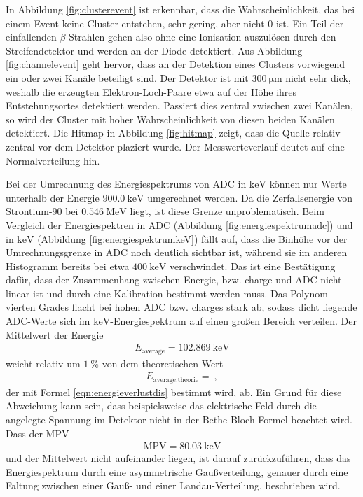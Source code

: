In Abbildung \ref{fig:clusterevent} ist erkennbar, dass die Wahrscheinlichkeit, das bei einem Event keine Cluster entstehen, sehr gering, aber nicht 0 ist.
Ein Teil der einfallenden $\beta$-Strahlen gehen also ohne eine Ionisation auszulösen durch den Streifendetektor und werden an der Diode detektiert.
Aus Abbildung \ref{fig:channelevent} geht hervor, dass an der Detektion eines Clusters vorwiegend ein oder zwei Kanäle beteiligt sind. Der Detektor ist mit
$\SI{300}{\micro\meter}$ nicht sehr dick, weshalb die erzeugten Elektron-Loch-Paare etwa auf der Höhe ihres Entstehungsortes detektiert werden. Passiert dies zentral zwischen
zwei Kanälen, so wird der Cluster mit hoher Wahrscheinlichkeit von diesen beiden Kanälen detektiert. Die Hitmap in Abbildung \ref{fig:hitmap} zeigt, dass die Quelle relativ zentral vor dem Detektor
plaziert wurde. Der Messwerteverlauf deutet auf eine Normalverteilung hin.

Bei der Umrechnung des Energiespektrums von ADC in $\si{\kilo\electronvolt}$ können nur Werte unterhalb der Energie $\SI{900.0}{\kilo\electronvolt}$ umgerechnet werden.
Da die Zerfallsenergie von Strontium-90 bei $\SI{0.546}{\mega\electronvolt}$ \cite{anleitung} liegt, ist diese Grenze unproblematisch.
Beim Vergleich der Energiespektren in ADC (Abbildung \ref{fig:energiespektrumadc}) und in $\si{\kilo\electronvolt}$ (Abbildung \ref{fig:energiespektrumkeV}) fällt auf, dass die Binhöhe vor der Umrechnungsgrenze in ADC noch deutlich sichtbar ist, während
sie im anderen Histogramm bereits bei etwa $\SI{400}{\kilo\electronvolt}$ verschwindet. Das ist eine Bestätigung dafür, dass der Zusammenhang zwischen
Energie, bzw. charge und ADC nicht linear ist und durch eine Kalibration bestimmt werden muss. Das Polynom vierten Grades flacht bei hohen ADC bzw. charges stark ab, sodass
dicht liegende ADC-Werte sich im $\si{\kilo\electronvolt}$-Energiespektrum auf einen großen Bereich verteilen. Der Mittelwert der Energie
\begin{align}
  E_\text{average} = \SI{102.869}{\kilo\electronvolt}
\end{align}
weicht relativ um $\SI{1}{\percent}$ von dem theoretischen Wert
\begin{align}
  E_\text{average,theorie} = \SI{}{},
\end{align}
der mit Formel \eqref{eqn:energieverlustdis} bestimmt wird, ab. Ein Grund für diese Abweichung kann sein, dass beispielsweise das elektrische Feld durch die angelegte Spannung im Detektor nicht in
der Bethe-Bloch-Formel beachtet wird. Dass der MPV
\begin{align}
  \text{MPV} = \SI{80.03}{\kilo\electronvolt}
\end{align}
und der Mittelwert nicht aufeinander liegen, ist darauf zurückzuführen, dass das Energiespektrum durch eine asymmetrische Gaußverteilung, genauer
durch eine Faltung zwischen einer Gauß- und einer Landau-Verteilung, beschrieben wird.
